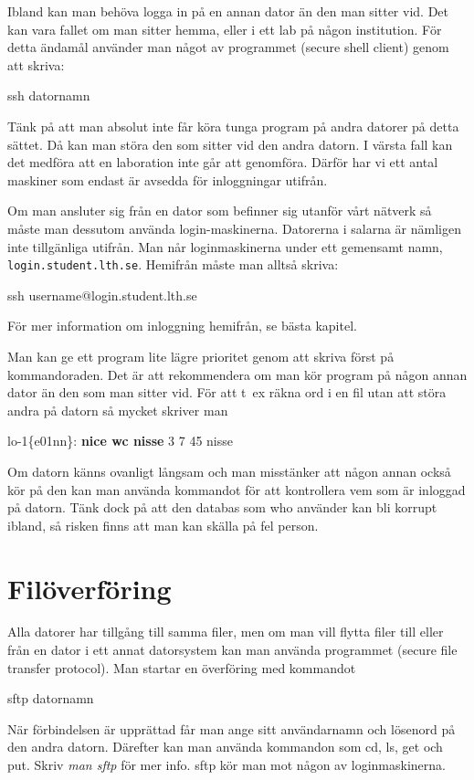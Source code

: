 \documentclass[a4paper,twocolumn]{book}
\begin{document}
Ibland kan man behöva logga in på en annan dator än den man sitter
vid. Det kan vara fallet om man sitter hemma, eller i ett lab på någon
institution. För detta ändamål
använder man något av programmet  (secure shell client) genom att
skriva:
\begin{ttquote}
  ssh datornamn \\
\end{ttquote}

Tänk på att man absolut inte får köra tunga program på andra datorer
på detta sättet. Då kan man störa den som sitter vid den andra datorn.
I värsta fall kan det medföra att en laboration inte går att
genomföra. Därför har vi ett antal maskiner
som endast är avsedda för
inloggningar utifrån. 

Om man ansluter sig från en dator som befinner sig utanför vårt nätverk så
måste man dessutom använda login-maskinerna. Datorerna i salarna är nämligen
inte tillgänliga utifrån. Man når loginmaskinerna under ett gemensamt namn,
\texttt{login.student.lth.se}.
Hemifrån måste man alltså skriva:
\begin{ttquote}
  ssh username@login.student.lth.se 
\end{ttquote}
För mer information om inloggning hemifrån, se bästa kapitel. 

Man kan ge ett program lite lägre prioritet genom att skriva
 först på kommandoraden. Det är att rekommendera om man
kör program på någon annan dator än den som man sitter
vid. För att t~ex räkna ord i en fil utan att störa andra på datorn så
mycket skriver man
\begin{example}
lo-1\{e01nn\}: \textbf{nice wc nisse}
       3       7      45 nisse
\end{example}

Om datorn känns ovanligt långsam och man misstänker att någon annan
också kör på den kan man använda kommandot  för att
kontrollera vem som är inloggad på datorn. Tänk dock på att den
databas som who använder kan bli korrupt ibland, så risken finns att
man kan skälla på fel person.

\section{Filöverföring}

\label{ftp}Alla datorer har tillgång till samma
filer, men om man vill flytta filer till eller från en dator i ett
annat datorsystem kan man använda programmet  (secure file
transfer protocol). Man startar en överföring med kommandot
\begin{ttquote}
  sftp datornamn
\end{ttquote}
När förbindelsen är upprättad får man ange sitt användarnamn och
lösenord på den andra datorn. Därefter kan man använda kommandon som cd, ls,
get och put. Skriv \emph{man sftp} för mer info.
sftp kör man mot någon av loginmaskinerna.
\end{document}
